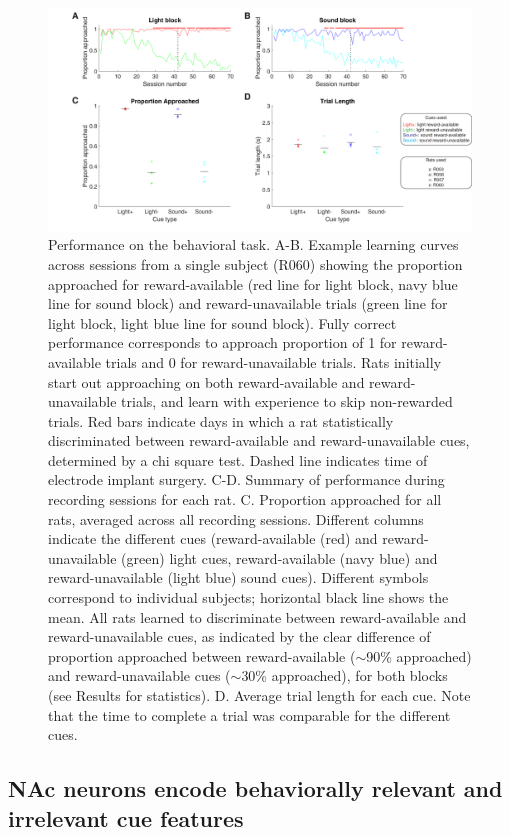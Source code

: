 \documentclass[11pt]{article}
\begin{document}
\begin{figure}[h]
\centering
\includegraphics[width=\textwidth]{Fig 4 - Behavioral results.png}
\caption{Performance on the behavioral task. A-B. Example learning curves across sessions from a single subject (R060) showing the proportion approached for reward-available (red line for light block, navy blue line for sound block) and reward-unavailable trials (green line for light block, light blue line for sound block). Fully correct performance corresponds to approach proportion of 1 for reward-available trials and 0 for reward-unavailable trials. Rats initially start out approaching on both reward-available and reward-unavailable trials, and learn with experience to skip non-rewarded trials. Red bars indicate days in which a rat statistically discriminated between reward-available and reward-unavailable cues, determined by a chi square test. Dashed line indicates time of electrode implant surgery. C-D. Summary of performance during recording sessions for each rat. C. Proportion approached for all rats, averaged across all recording sessions. Different columns indicate the different cues (reward-available (red) and reward-unavailable (green) light cues, reward-available (navy blue) and reward-unavailable (light blue) sound cues). Different symbols correspond to individual subjects; horizontal black line shows the mean. All rats learned to discriminate between reward-available and reward-unavailable cues, as indicated by the clear difference of proportion approached between reward-available ($\sim$90\% approached) and reward-unavailable cues ($\sim$30\% approached), for both blocks (see Results for statistics). D. Average trial length for each cue. Note that the time to complete a trial was comparable for the different cues.}
\label{fig:behav}
\end{figure}

\subsection*{NAc neurons encode behaviorally relevant and irrelevant cue features}
\end{document}
